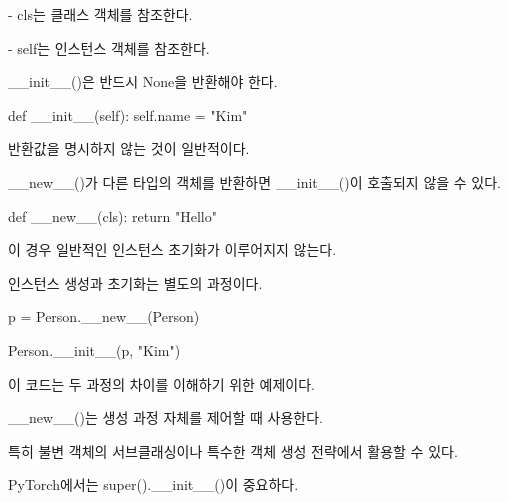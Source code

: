 \begin{dhksmry}
    - cls는 클래스 객체를 참조한다.

    - self는 인스턴스 객체를 참조한다.
\end{dhksmry}

\begin{dhknote}
\begin{dhksmry}[centered]
__init__()은 반드시 None을 반환해야 한다.
\end{dhksmry}
\end{dhknote}

\begin{dhkcode}
def __init__(self):
    self.name = "Kim"
\end{dhkcode}

반환값을 명시하지 않는 것이 일반적이다.

\begin{dhknote}
\begin{dhksmry}[centered]
__new__()가 다른 타입의 객체를 반환하면
__init__()이 호출되지 않을 수 있다.
\end{dhksmry}
\end{dhknote}

\begin{dhkcode}
def __new__(cls):
    return "Hello"
\end{dhkcode}

이 경우 일반적인  인스턴스 초기화가 이루어지지 않는다.

\begin{dhknote}
\begin{dhksmry}[centered]
인스턴스 생성과 초기화는 별도의 과정이다.
\end{dhksmry}
\end{dhknote}

\begin{dhkcode}
p = Person.__new__(Person)

Person.__init__(p, "Kim")
\end{dhkcode}

이 코드는 두 과정의 차이를 이해하기 위한 예제이다.

\begin{dhknote}
\begin{dhksmry}[centered]
__new__()는 생성 과정 자체를 제어할 때 사용한다.
\end{dhksmry}
\end{dhknote}

특히 불변 객체의 서브클래싱이나 특수한 객체 생성 전략에서 활용할 수 있다.

\begin{dhknote}
\begin{dhksmry}[centered]
PyTorch에서는 super().__init__()이 중요하다.
\end{dhksmry}
\end{dhknote}

